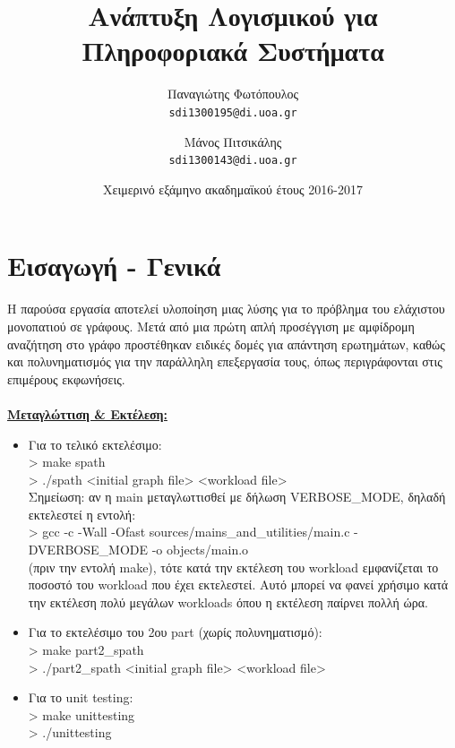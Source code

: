 \documentclass[11pt]{article}
\title{Ανάπτυξη Λογισμικού για Πληροφοριακά Συστήματα}
\author{Παναγιώτης Φωτόπουλος\\
  \texttt{sdi1300195@di.uoa.gr}
  \and Μάνος Πιτσικάλης\\
  \texttt{sdi1300143@di.uoa.gr}}
\date{Χειμερινό εξάμηνο ακαδημαϊκού έτους 2016-2017}
\begin{document}
\maketitle


\section{Εισαγωγή - Γενικά}
Η παρούσα εργασία αποτελεί υλοποίηση μιας λύσης για το πρόβλημα του ελάχιστου μονοπατιού σε γράφους. Μετά από μια πρώτη απλή προσέγγιση με αμφίδρομη αναζήτηση στο γράφο προστέθηκαν ειδικές δομές για απάντηση ερωτημάτων, καθώς και πολυνηματισμός για την παράλληλη επεξεργασία τους, όπως περιγράφονται στις επιμέρους εκφωνήσεις.\\\\
\textbf{\underline{Μεταγλώττιση \& Εκτέλεση:}}
\begin{itemize}
\item Για το τελικό εκτελέσιμο:\\
> make spath\\
> ./spath <initial graph file> <workload file>\\
Σημείωση: αν η main μεταγλωττισθεί με δήλωση VERBOSE\_MODE, δηλαδή εκτελεστεί η εντολή: \\
> gcc -c -Wall -Ofast sources/mains\_and\_utilities/main.c -DVERBOSE\_MODE -o objects/main.o\\
(πριν την εντολή make), τότε κατά την εκτέλεση του workload εμφανίζεται το ποσοστό του workload που έχει εκτελεστεί. Αυτό μπορεί να φανεί χρήσιμο κατά την εκτέλεση πολύ μεγάλων workloads όπου η εκτέλεση παίρνει πολλή ώρα.
\item Για το εκτελέσιμο του 2ου part (χωρίς πολυνηματισμό):\\
> make part2\_spath\\
> ./part2\_spath <initial graph file> <workload file>
\item Για το unit testing:\\
> make unittesting\\
> ./unittesting
\end{itemize}
\end{document}
